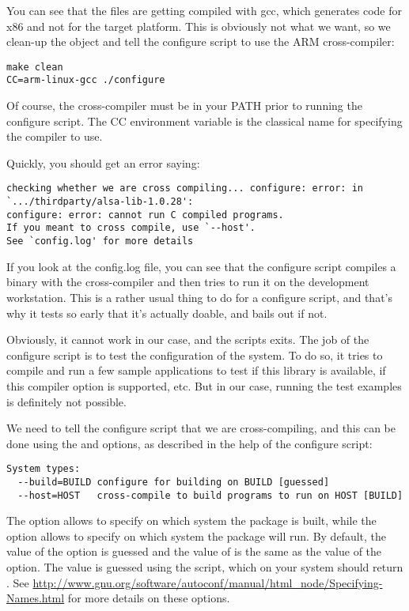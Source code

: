 You can see that the files are getting compiled with gcc, which
generates code for x86 and not for the target platform. This is
obviously not what we want, so we clean-up the object and tell the
configure script to use the ARM cross-compiler:

\begin{verbatim}
make clean
CC=arm-linux-gcc ./configure
\end{verbatim}

Of course, the  cross-compiler must be in your
PATH prior to running the configure script. The CC environment
variable is the classical name for specifying the compiler to
use.

Quickly, you should get an error saying:

\footnotesize
\begin{verbatim}
checking whether we are cross compiling... configure: error: in `.../thirdparty/alsa-lib-1.0.28':
configure: error: cannot run C compiled programs.
If you meant to cross compile, use `--host'.
See `config.log' for more details
\end{verbatim}
\normalsize

If you look at the config.log file, you can see that the configure
script compiles a binary with the cross-compiler and then tries to run
it on the development workstation. This is a rather usual thing to do
for a configure script, and that's why it tests so early that it's
actually doable, and bails out if not.

Obviously, it cannot work in our case, and the scripts exits. The job
of the configure script is to test the configuration of the system. To
do so, it tries to compile and run a few sample applications to test
if this library is available, if this compiler option is supported,
etc. But in our case, running the test examples is definitely not
possible.

We need to tell the configure script that we are cross-compiling, and
this can be done using the  and  options,
as described in the help of the configure script:

\begin{verbatim}
System types:
  --build=BUILD	configure for building on BUILD [guessed]
  --host=HOST	cross-compile to build programs to run on HOST [BUILD]
\end{verbatim}

The  option allows to specify on which system the
package is built, while the  option allows to specify on
which system the package will run. By default, the value of the
 option is guessed and the value of  is the
same as the value of the  option. The value is guessed
using the  script, which on your system should
return . See
\url{http://www.gnu.org/software/autoconf/manual/html_node/Specifying-Names.html}
for more details on these options.

